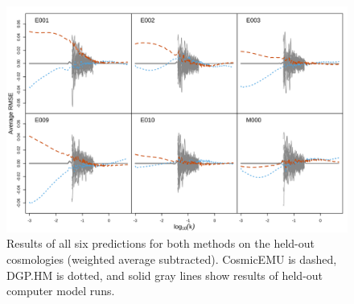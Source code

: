 \documentclass[11pt]{article}
\begin{document}
\begin{figure}[ht]
    \centering
    \includegraphics[width=6in]{pred_1to6.png}
    \caption{Results of all six predictions for both methods on the held-out cosmologies (weighted average subtracted). CosmicEMU is dashed, DGP.HM is dotted, and solid gray lines show results of held-out computer model runs.}
    \label{fig:plot_pred_1to6}
\end{figure}



\end{document}
